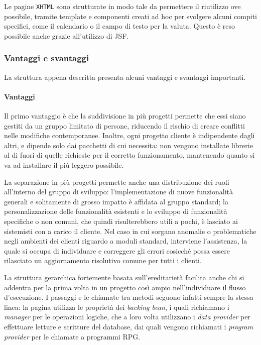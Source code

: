 Le pagine \texttt{XHTML} sono strutturate in modo tale da permettere il riutilizzo ove possibile, tramite template e componenti creati ad hoc per svolgere alcuni compiti specifici, come il calendario o il campo di testo per la valuta. Questo è reso possibile anche grazie all'utilizzo di JSF.

\subsubsection{Vantaggi e svantaggi}
La struttura appena descritta presenta alcuni vantaggi e svantaggi importanti.
\paragraph{Vantaggi}
Il primo vantaggio è che la suddivisione in più progetti permette che essi siano gestiti da un gruppo limitato di persone, riducendo il rischio di creare conflitti nelle modifiche contemporanee. Inoltre, ogni progetto cliente è indipendente dagli altri, e dipende solo dai pacchetti di cui necessita: non vengono installate librerie al di fuori di quelle richieste per il corretto funzionamento, mantenendo quanto si va ad installare il più leggero possibile.

La separazione in più progetti permette anche una distribuzione dei ruoli all'interno del gruppo di sviluppo: l'implementazione di nuove funzionalità generali e solitamente di grosso impatto è affidata al gruppo standard; la personalizzazione delle funzionalità esistenti e lo sviluppo di funzionalità specifiche o non comuni, che quindi risulterebbero utili a pochi, è lasciato ai sistemisti con a carico il cliente. Nel caso in cui sorgano anomalie o problematiche negli ambienti dei clienti riguardo a moduli standard, interviene l'assistenza, la quale si occupa di individuare e correggere gli errori cosicché possa essere rilasciato un aggiornamento risolutivo comune per tutti i clienti.

La struttura gerarchica fortemente basata sull'ereditarietà facilita anche chi si addentra per la prima volta in un progetto così ampio nell'individuare il flusso d'esecuzione. I passaggi e le chiamate tra metodi seguono infatti sempre la stessa linea: la pagina utilizza le proprietà dei \textit{backing bean}, i quali richiamano i \textit{manager} per le operazioni logiche, che a loro volta utilizzano i \textit{data provider} per effettuare letture e scritture del database, dai quali vengono richiamati i \textit{program provider} per le chiamate a programmi RPG. 

